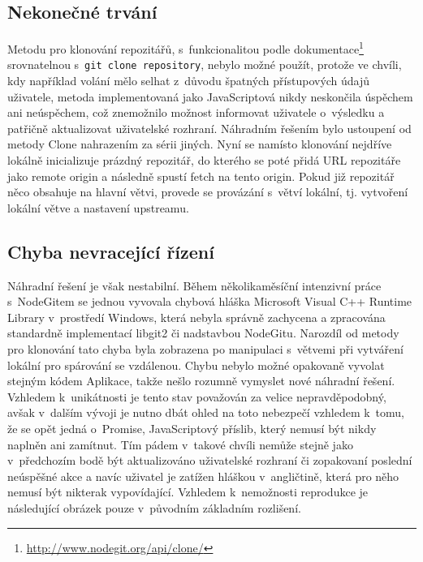 \subsection{Nekonečné trvání}

Metodu pro klonování repozitářů, s~funkcionalitou podle dokumentace\footnote{\url{http://www.nodegit.org/api/clone/}} srovnatelnou s~\texttt{git clone repository}, nebylo možné použít, protože ve chvíli, kdy například volání mělo selhat z~důvodu špatných přístupových údajů uživatele, metoda implementovaná jako JavaScriptová  nikdy neskončila úspěchem ani neúspěchem, což znemožnilo možnost informovat uživatele o~výsledku a patřičně aktualizovat uživatelské rozhraní. Náhradním řešením bylo ustoupení od metody Clone nahrazením za sérii jiných. Nyní se namísto klonování nejdříve lokálně inicializuje prázdný repozitář, do kterého se poté přidá URL repozitáře jako remote origin a následně spustí fetch na tento origin. Pokud již repozitář něco obsahuje na hlavní větvi, provede se provázání s~větví lokální, tj. vytvoření lokální větve a nastavení upstreamu.

\subsection{Chyba nevracející řízení}

Náhradní řešení je však nestabilní. Během několikaměsíční intenzivní práce s~NodeGitem se jednou vyvovala chybová hláška Microsoft Visual C++ Runtime Library v~prostředí Windows, která nebyla správně zachycena a zpracována standardně implementací libgit2 či nadstavbou NodeGitu. Narozdíl od metody pro klonování tato chyba byla zobrazena po manipulaci s~větvemi při vytváření lokální pro spárování se vzdálenou. Chybu nebylo možné opakovaně vyvolat stejným kódem Aplikace, takže nešlo rozumně vymyslet nové náhradní řešení. Vzhledem k~unikátnosti je tento stav považován za velice nepravděpodobný, avšak v~dalším vývoji je nutno dbát ohled na toto nebezpečí vzhledem k~tomu, že se opět jedná o~Promise, JavaScriptový příslib, který nemusí být nikdy naplněn ani zamítnut. Tím pádem v~takové chvíli nemůže stejně jako v~předchozím bodě být aktualizováno uživatelské rozhraní či zopakovaní poslední neúspěšné akce a navíc uživatel je zatížen hláškou v~angličtině, která pro něho nemusí být nikterak vypovídající. Vzhledem k~nemožnosti reprodukce je následující obrázek pouze v~původním základním rozlišení.

